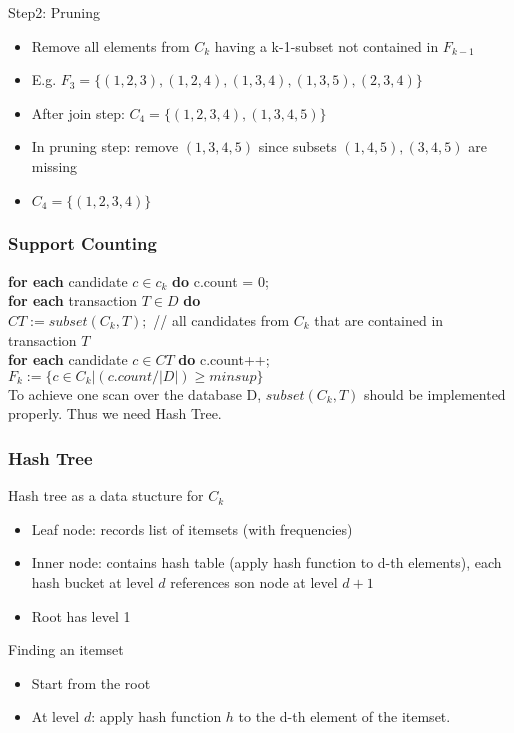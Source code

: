 \documentclass[../notes.tex]{subfiles}
\begin{document}
Step2: Pruning
\begin{itemize}
  \item Remove all elements from $C_k$ having a k-1-subset not contained in $F_{k-1}$
  \item E.g. $F_3 = \{(1,2,3), (1,2,4), (1,3,4), (1,3,5), (2,3,4)\}$
  \item After join step: $C_4 = \{(1,2,3,4), (1,3,4,5)\}$
  \item In pruning step: remove $(1,3,4,5)$ since subsets $(1,4,5), (3,4,5)$ are missing
  \item $C_4 = \{(1,2,3,4)\}$
\end{itemize}

\subsubsection{Support Counting}
\textbf{for each} candidate $c \in c_k$ \textbf{do} c.count = 0; \\
\textbf{for each} transaction $T \in D$ \textbf{do} \\
\tab $CT := subset(C_k, T);$ // all candidates from $C_k$ that are contained in transaction $T$ \\
\tab \textbf{for each} candidate $c \in CT$ \textbf{do} c.count++; \\
$F_k := \{c \in C_k | (c.count / |D|) \ge minsup\}$\\

To achieve one scan over the database D, $subset(C_k, T)$ should be implemented properly. Thus we need Hash Tree.

\subsubsection{Hash Tree}
Hash tree as a data stucture for $C_k$
\begin{itemize}
  \item Leaf node: records list of itemsets (with frequencies)
  \item Inner node: contains hash table (apply hash function to d-th elements), each hash bucket at level $d$ references son node at level $d+1$
  \item Root has level 1
\end{itemize}

Finding an itemset
\begin{itemize}
  \item Start from the root
  \item At level $d$: apply hash function $h$ to the d-th element of the itemset.
\end{itemize}
\end{document}
